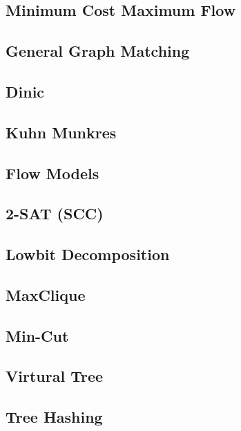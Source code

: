 \documentclass[a4paper,10pt,twocolumn,oneside]{article}
\begin{document}
\subsection{Minimum Cost Maximum Flow}

\subsection{General Graph Matching}

\subsection{Dinic}

\subsection{Kuhn Munkres}

\subsection{Flow Models}

\subsection{2-SAT (SCC)}

\subsection{Lowbit Decomposition}

\subsection{MaxClique}

\subsection{Min-Cut}

\subsection{Virtural Tree}

\subsection{Tree Hashing}

\end{document}
